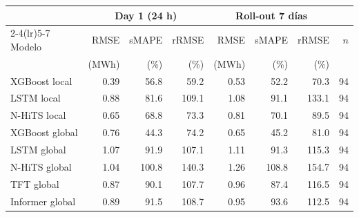 \begin{tabular}{lrrrrrrr}
\toprule
 & \multicolumn{3}{c}{Day 1 (24 h)} & \multicolumn{3}{c}{Roll-out 7 días} & \\
\cmidrule(lr){2-4}\cmidrule(lr){5-7}
Modelo & RMSE & sMAPE & rRMSE & RMSE & sMAPE & rRMSE & $n$ \\
 & (MWh) & (\%) & (\%) & (MWh) & (\%) & (\%) & \\
\midrule
XGBoost local & 0.39 & 56.8 & 59.2 & 0.53 & 52.2 & 70.3 & 94 \\
LSTM local & 0.88 & 81.6 & 109.1 & 1.08 & 91.1 & 133.1 & 94 \\
N-HiTS local & 0.65 & 68.8 & 73.3 & 0.81 & 70.1 & 89.5 & 94 \\
XGBoost global & 0.76 & 44.3 & 74.2 & 0.65 & 45.2 & 81.0 & 94 \\
LSTM global & 1.07 & 91.9 & 107.1 & 1.11 & 91.3 & 115.3 & 94 \\
N-HiTS global & 1.04 & 100.8 & 140.3 & 1.26 & 108.8 & 154.7 & 94 \\
TFT global & 0.87 & 90.1 & 107.7 & 0.96 & 87.4 & 116.5 & 94 \\
Informer global & 0.89 & 91.5 & 108.7 & 0.95 & 93.6 & 112.5 & 94 \\
\bottomrule
\end{tabular}